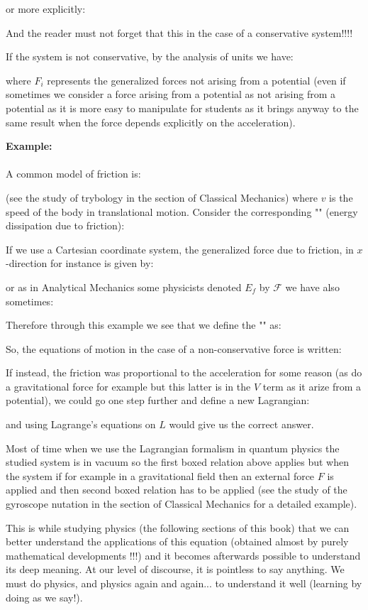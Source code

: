 	or more explicitly:
	
	And the reader must not forget that this in the case of a conservative system!!!!
	
	If the system is not conservative, by the analysis of units we have:
	
	where $F_i$ represents the generalized forces not arising from a potential (even if sometimes we consider a force arising from a potential as not arising from a potential as it is more easy to manipulate for students as it brings anyway to the same result when the force depends explicitly on the acceleration).
	\begin{tcolorbox}[colframe=black,colback=white,sharp corners]
	\textbf{{\Large {}}Example:}\\\\
	A common model of friction is:
	
	(see the study of trybology in the section of Classical Mechanics) where $v$ is the speed of the body in translational motion. Consider the corresponding "" (energy dissipation due to friction):
	
	If we use a Cartesian coordinate system, the generalized force due to friction, in $x$-direction for instance is given by:
	
	
	or as in Analytical Mechanics some physicists denoted $E_f$ by $\mathcal{F}$ we have also sometimes:
	
	Therefore through this example we see that we define the "" as:
	
	 So, the equations of motion in the case of a non-conservative force is written:
	
	If instead, the friction was proportional to the acceleration for some reason (as do a gravitational force for example but this latter is in the $V$ term as it arize from a potential), we could go one step further and define a new Lagrangian: 
	
	 and using Lagrange's equations on $L$ would give us the correct answer.
	\end{tcolorbox}
	Most of time when we use the Lagrangian formalism in quantum physics the studied system is in vacuum so the first boxed relation above applies but when the system if for example in a gravitational field then an external force $F$ is applied and then second boxed relation has to be applied (see the study of the gyroscope nutation in the section of Classical Mechanics for a detailed example).
	\begin{tcolorbox}[title=Remark,colframe=black,arc=10pt]
	This is while studying physics (the following sections of this book) that we can better understand the applications of this equation (obtained almost by purely mathematical developments !!!) and it becomes afterwards possible to understand its deep meaning. At our level of discourse, it is pointless to say anything. We must do physics, and physics again and again... to understand it well (learning by doing as we say!).
	\end{tcolorbox}

